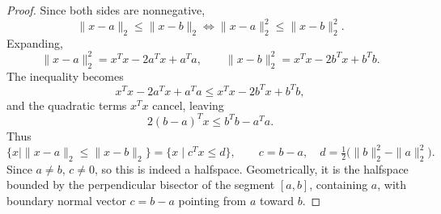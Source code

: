 \documentclass[12pt]{book}
\begin{document}
\begin{proof}
    Since both sides are nonnegative,
    \[
        \|x-a\|_2 \le \|x-b\|_2 \iff \|x-a\|_2^2 \le \|x-b\|_2^2.
    \]
    Expanding,
    \[
        \|x-a\|_2^2 = x^Tx - 2a^Tx + a^Ta, \qquad \|x-b\|_2^2 = x^Tx - 2b^Tx + b^Tb.
    \]
    The inequality becomes
    \[
        x^Tx - 2a^Tx + a^Ta \le x^Tx - 2b^Tx + b^Tb,
    \]
        and the quadratic terms $x^Tx$ cancel, leaving
    \[
        2(b-a)^Tx \le b^Tb - a^Ta.
    \]
    Thus
    \[
        \{x \mid \|x-a\|_2 \le \|x-b\|_2\} = \{x \mid c^Tx \le d\}, \qquad
        c = b-a, \quad d = \tfrac{1}{2}\big(\|b\|_2^2 - \|a\|_2^2\big).
    \]
    Since $a \ne b$, $c \ne 0$, so this is indeed a halfspace. Geometrically, it is the halfspace bounded by the perpendicular bisector of the segment $[a,b]$, containing $a$, with boundary normal vector $c = b - a$ pointing from $a$ toward $b$.
\end{proof}








\end{document}
